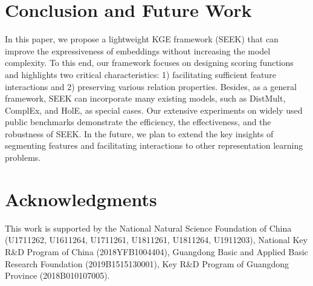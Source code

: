 \documentclass[11pt,a4paper]{article}
\begin{document}
 \section{Conclusion and Future Work}
\label{sec:conclusion}
In this paper, we propose a lightweight KGE framework (SEEK) that can improve the expressiveness of embeddings without increasing the model complexity. To this end, our framework focuses on designing scoring functions and highlights two critical characteristics: 1) facilitating sufficient feature interactions and 2) preserving various relation properties.
Besides, as a general framework, SEEK can incorporate many existing models, such as DistMult, ComplEx, and HolE, as special cases.
Our extensive experiments on widely used public benchmarks demonstrate the efficiency, the effectiveness, and the robustness of SEEK.
In the future, we plan to extend the key insights of segmenting features and facilitating interactions to other representation learning problems. \section*{Acknowledgments}

This work is supported by the National Natural Science Foundation of China (U1711262, U1611264, U1711261, U1811261, U1811264, U1911203), National Key R\&D Program of China (2018YFB1004404), Guangdong Basic and Applied Basic Research Foundation (2019B1515130001),  Key R\&D Program of Guangdong Province (2018B010107005). 

\balance


\end{document}
